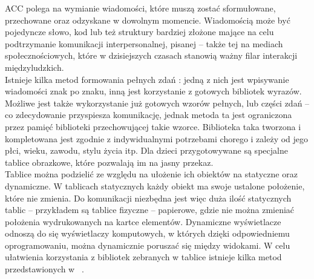 \documentclass[twoside,a4paper]{book}
\begin{document}
	ACC polega na wymianie wiadomości, które muszą zostać sformułowane, przechowane oraz odzyskane w dowolnym momencie. Wiadomością może być pojedyncze słowo, kod lub też struktury bardziej złożone mające na celu podtrzymanie komunikacji interpersonalnej, pisanej – także tej na mediach społecznościowych, które w dzisiejszych czasach stanowią ważny filar interakcji międzyludzkich.
\\ Istnieje kilka metod formowania pełnych zdań : jedną z nich jest wpisywanie wiadomości znak po znaku, inną jest korzystanie z gotowych bibliotek wyrazów. Możliwe jest także wykorzystanie już gotowych wzorów pełnych, lub części zdań – co zdecydowanie przyspiesza komunikację, jednak metoda ta jest ograniczona przez pamięć biblioteki przechowującej takie wzorce. Biblioteka taka tworzona i kompletowana jest zgodnie z indywidualnymi potrzebami chorego i zależy od jego płci, wieku, zawodu, stylu życia itp. Dla dzieci przygotowywane są specjalne tablice obrazkowe, które pozwalają im na jasny przekaz. \\
Tablice można podzielić ze względu na ułożenie ich obiektów na statyczne oraz dynamiczne. W tablicach statycznych każdy obiekt ma swoje ustalone położenie, które nie zmienia. Do komunikacji niezbędna jest więc duża ilość statycznych tablic – przykładem są tablice fizyczne – papierowe, gdzie nie można zmieniać położenia wydrukowanych na kartce elementów. Dynamiczne wy\-świe\-tla\-cze odnoszą do się wy\-świe\-tla\-czy komputowych, w których dzięki odpowiedniemu oprogramowaniu, można dynamicznie poruszać się między widokami.  
W celu ułatwienia korzystania z bibliotek zebranych w tablice istnieje kilka metod przedstawionych w ~\cite{augmentative}.
\end{document}
